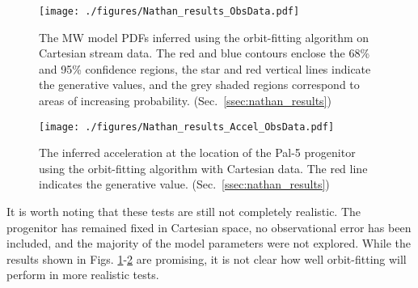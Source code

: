 \begin{figure}
\texttt{[image: ./figures/Nathan\_results\_ObsData.pdf]}
  \caption{The MW model PDFs inferred using the orbit-fitting algorithm on Cartesian stream data.  The red and blue 
  contours enclose the 68\% and 95\% confidence regions, the star and red vertical lines indicate 
  the generative values, and the grey shaded regions correspond to areas of increasing 
  probability.  (Sec.~\ref{ssec:nathan_results})}
  \label{plot_nathan_results_ObsData}
\end{figure}

\begin{figure}
\texttt{[image: ./figures/Nathan\_results\_Accel\_ObsData.pdf]}
  \caption{The inferred acceleration at the location of the Pal-5 progenitor using the 
  orbit-fitting algorithm with Cartesian data.  The red line indicates the generative value.  (Sec.~\ref{ssec:nathan_results})}
  \label{plot_nathan_results_ObsData_accel}
\end{figure}

It is worth noting that these tests are still not completely realistic.  The progenitor has remained fixed in Cartesian space, no 
observational error has been included, and the majority of the model parameters were not explored.  While the results shown in 
Figs. \ref{plot_nathan_results_ObsData}-\ref{plot_nathan_results_ObsData_accel} are promising, it is not clear how well 
orbit-fitting will perform in more realistic tests.